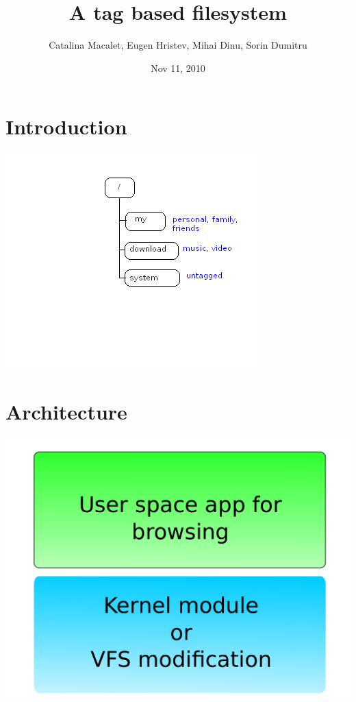 \documentclass{beamer}
\title[TagFS]{A tag based filesystem}
\author{Catalina Macalet, Eugen Hristev, Mihai Dinu, Sorin Dumitru}
\institute{Politehnic University of Bucharest}
\date{Nov 11, 2010}
\begin{document}

\begin{frame}
  \titlepage
\end{frame}

\section{Introduction}

\begin{frame}
  \includegraphics[scale=0.8]{art/schema.png}
\end{frame}

\section{Architecture}

\begin{frame}
  \includegraphics[scale=0.5]{art/archall.pdf}
\end{frame}
\end{document}
